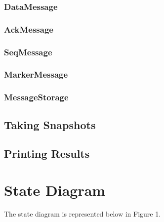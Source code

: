 \documentclass{article}
\begin{document}
\subsubsection{DataMessage}


\subsubsection{AckMessage}





\subsubsection{SeqMessage}


\subsubsection{MarkerMessage}

\subsubsection{MessageStorage}


\subsection{Taking Snapshots}


\subsection{Printing Results}


\section{State Diagram}
The state diagram is represented below in Figure 1.\\
\end{document}
